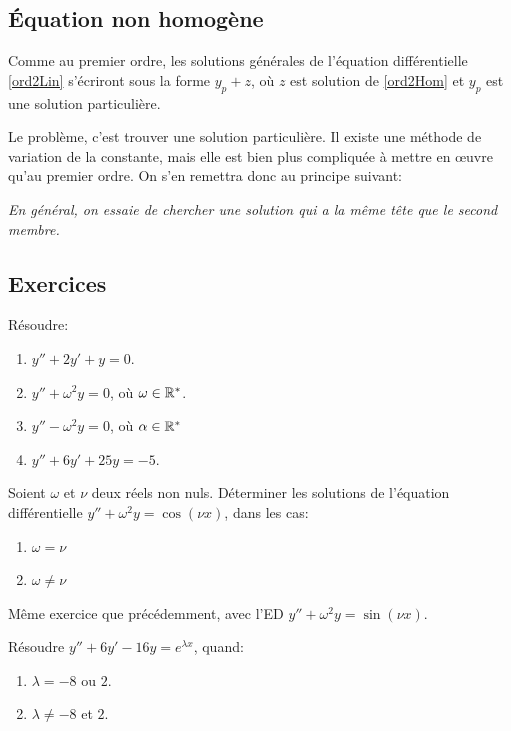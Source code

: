 \documentclass[../main.tex]{subfiles}
\begin{document}
\subsection{Équation non homogène}

Comme au premier ordre, les solutions générales de l'équation différentielle \eqref{ord2Lin} s'écriront sous la forme $y_p+z$, où $z$ est solution de \eqref{ord2Hom} et $y_p$ est une solution particulière.

Le problème, c'est trouver une solution particulière. Il existe une méthode de variation de la constante, mais elle est bien plus compliquée à mettre en œuvre qu'au premier ordre. On s'en remettra donc au principe suivant:

\textit{En général, on essaie de chercher une solution qui a la même tête que le second membre.}

\subsection{Exercices}

\begin{exo}Résoudre:
	\begin{multicols}{2}
		\begin{enumerate}
			\item $y'' + 2y' + y = 0$.
			\item $y'' + \omega^2y = 0$, où $\omega\in\mathbb R^*$.
			\item $y'' - \omega^2y = 0$, où $\alpha\in\mathbb R^*$
			\item $y'' + 6y' + 25y = -5$.
		\end{enumerate}
	\end{multicols}
\end{exo}

\begin{exo}
	Soient $\omega$ et $\nu$ deux réels non nuls. Déterminer les solutions de l'équation différentielle $y''+\omega^2y = \cos(\nu x)$, dans les cas:\begin{enumerate}
		\item $\omega=\nu$
		\item $\omega\neq\nu$
	\end{enumerate}
\end{exo}

\begin{exo}
	Même exercice que précédemment, avec l'ED $y'' + \omega^2y = \sin(\nu x)$.
\end{exo}

\begin{exo}
	Résoudre $y''+6y'-16y = e^{\lambda x}$, quand:\begin{enumerate}
		\item $\lambda = -8$ ou $2$.
		\item $\lambda\neq -8$ et $2$.
	\end{enumerate}
\end{exo}
\end{document}
